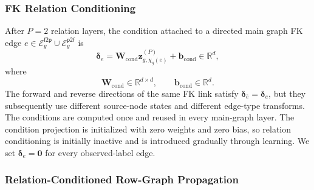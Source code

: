 \documentclass[11pt]{article}
\newcommand{\R}{\mathbb{R}}
\begin{document}
\subsubsection{FK Relation Conditioning}
\label{sec:fk-conditioning}

After \(P=2\) relation layers, the condition attached to a directed main
graph FK edge \(e\in\mathcal E_g^{\mathsf{f2p}}\cup
\mathcal E_g^{\mathsf{p2f}}\) is
\begin{equation}
    \boxed{
    \boldsymbol\delta_e
    =
    \mathbf W_{\mathrm{cond}}
    \mathbf z_{g,\chi_g(e)}^{(P)}
    +
    \mathbf b_{\mathrm{cond}}
    }
    \in\R^d,
    \label{eq:fk-condition}
\end{equation}
where
\begin{equation}
    \mathbf W_{\mathrm{cond}}\in\R^{d\times d},
    \qquad
    \mathbf b_{\mathrm{cond}}\in\R^d.
    \label{eq:condition-domains}
\end{equation}
The forward and reverse directions of the same FK link satisfy
\(\boldsymbol\delta_{\bar e}=\boldsymbol\delta_e\), but they subsequently
use different source-node states and different edge-type transforms.  The
conditions are computed once and reused in every main-graph layer.  The
condition projection is initialized with zero weights and zero bias, so
relation conditioning is
initially inactive and is introduced gradually through learning.  We set
\(\boldsymbol\delta_e=\mathbf0\) for every observed-label edge.

\subsubsection{Relation-Conditioned Row-Graph Propagation}
\label{sec:main-propagation}
\end{document}

